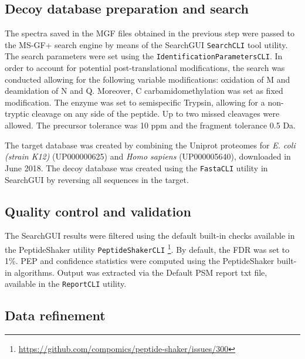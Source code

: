 \documentclass[11pt, a4paper]{report}
\begin{document}

\subsection{Decoy database preparation and search}
\label{subsec:database_preparation}

The spectra saved in the MGF files obtained in the previous step were passed to the MS-GF+ search engine \cite{Kim2014} by means of the SearchGUI \texttt{SearchCLI} tool \cite{Barsnes2018} utility. The search parameters were set using the \texttt{IdentificationParametersCLI}. In order to account for potential post-translational modifications, the search was conducted allowing for the following variable modifications: oxidation of M and deamidation of N and Q. Moreover, C carbamidomethylation was set as fixed modification. The enzyme was set to semispecific Trypsin, allowing for a non-tryptic cleavage on any side of the peptide. Up to two missed cleavages were allowed. The precursor tolerance was 10 ppm and the fragment tolerance 0.5 Da. 


The target database was created by combining the Uniprot proteomes for \textit{E. coli (strain K12)} (UP000000625) and \textit{Homo sapiens} (UP000005640), downloaded in June 2018. The decoy database was created using the \texttt{FastaCLI} utility in SearchGUI by reversing all sequences in the target.

\subsection{Quality control and validation}

The SearchGUI results were filtered using the default built-in checks available in the PeptideShaker utility \texttt{PeptideShakerCLI} \cite{Vaudel2015} \footnote{\href{https://github.com/compomics/peptide-shaker/issues/300}{https://github.com/compomics/peptide-shaker/issues/300}}. By default, the FDR was set to 1\%. PEP and confidence statistics were computed using the PeptideShaker built-in algorithms. Output was extracted via the Default PSM report txt file, available in the \texttt{ReportCLI} utility.


\subsection{Data refinement}
\end{document}
